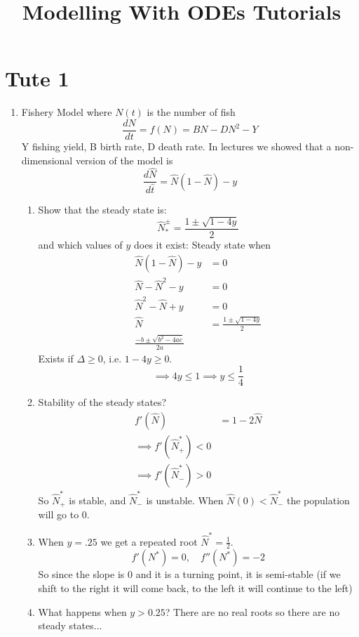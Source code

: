 \documentclass{/home/janmebows/Documents/LatexTemplates/myassignment}
\title{Modelling With ODEs Tutorials}
\begin{document}
\maketitle

\section{Tute 1}
\begin{enumerate}
    \item Fishery Model where $N(t)$ is the number of fish
    \[\frac{dN}{dt} = f(N) = BN - DN^2 - Y\]
Y fishing yield, B birth rate, D death rate.
In lectures we showed that a non-dimensional version of the model is
\[\frac{d\hat{N}}{d\hat{t}} = \hat{N}(1-\hat{N}) - y\]
\begin{enumerate}
    
    \item Show that the steady state is: 
    \[\hat{N}_*^{\pm} = \frac{1\pm \sqrt{1-4y}}{2}\]
    and which values of $y$ does it exist:
    Steady state when 
    \begin{align*}
        \hat{N}(1-\hat{N}) -y &= 0\\
        \hat{N} - \hat{N}^2 -y &= 0\\
        \hat{N}^2 - \hat{N} + y &= 0\\
        \hat{N} &= \frac{1 \pm \sqrt{1 - 4y}}{2}\\
        \frac{-b \pm \sqrt{b^2 - 4ac}}{2a}
    \end{align*}
    Exists if $\Delta \geq 0$, i.e. $1-4y \geq 0$.
    \[\implies 4y \leq 1 \implies y \leq \frac14\]
    \item Stability of the steady states?
    \begin{align*}
        f'(\hat{N}) &= 1 - 2\hat{N}\\
        \implies f'(\hat{N}^*_+) < 0 \\
        \implies f'(\hat{N}^*_-) > 0 
    \end{align*}
    So $\hat{N}^*_+$ is stable, and $\hat{N}^*_-$ is unstable. When $\hat{N}(0) < \hat{N}^*_-$ the population will go to $0$.
    \item When $y=.25$ we get a repeated root $\hat{N}^* = \frac12$.
    \[f'(N^*) = 0, \quad f''(N^*) = -2\]
    So since the slope is $0$ and it is a turning point, it is semi-stable (if we shift to the right it will come back, to the left it will continue to the left)
    
    \item What happens when $y > 0.25$? There are no real roots so there are no steady states...
    

\end{enumerate}
\end{enumerate}
\end{document}
